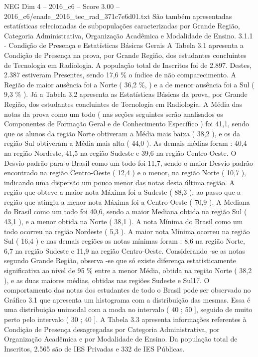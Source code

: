 \begin{textsample}{NEG Dim 4 – 2016\_c6 – Score 3.00 – 2016\_c6/enade\_2016\_tec\_rad\_371c7e6d01.txt}
São também apresentadas estatísticas selecionadas de subpopulações caracterizadas por Grande Região, Categoria Administrativa, Organização Acadêmica e Modalidade de Ensino. 3.1.1 - Condição de Presença e Estatísticas Básicas Gerais A Tabela 3.1 apresenta a Condição de Presença na prova, por Grande Região, dos estudantes concluintes de Tecnologia em Radiologia.
A população total de Inscritos foi de 2.897.
Destes, 2.387 estiveram Presentes, sendo 17,6 \% o índice de não comparecimento.
A Região de maior ausência foi a Norte ( 36,2 \%, ) e a de menor ausência foi a Sul ( 9,3 \% ).
Já a Tabela 3.2 apresenta as Estatísticas Básicas da prova, por Grande Região, dos estudantes concluintes de Tecnologia em Radiologia.
A Média das notas da prova como um todo ( nas seções seguintes serão analisados os Componentes de Formação Geral e de Conhecimento Específico ) foi 41,1, sendo que os alunos da região Norte obtiveram a Média mais baixa ( 38,2 ), e os da região Sul obtiveram a Média mais alta ( 44,0 ).
As demais médias foram : 40,4 na região Nordeste, 41,5 na região Sudeste e 39,6 na região Centro-Oeste.
O Desvio padrão para o Brasil como um todo foi 11,7, sendo o maior Desvio padrão encontrado na região Centro-Oeste ( 12,4 ) e o menor, na região Norte ( 10,7 ), indicando uma dispersão um pouco menor das notas desta última região.
A região que obteve a maior nota Máxima foi a Sudeste ( 88,3 ), ao passo que a região que atingiu a menor nota Máxima foi a Centro-Oeste ( 70,9 ).
A Mediana do Brasil como um todo foi 40,6, sendo a maior Mediana obtida na região Sul ( 43,1 ), e a menor obtida na Norte ( 38,1 ).
A nota Mínima do Brasil como um todo ocorreu na região Nordeste ( 5,3 ).
A maior nota Mínima ocorreu na região Sul ( 16,4 ) e nas demais regiões as notas mínimas foram : 8,6 na região Norte, 6,7 na região Sudeste e 11,9 na região Centro-Oeste.
Considerando -se as notas segundo Grande Região, observa -se que só existe diferença estatisticamente significativa ao nível de 95 \% entre a menor Média, obtida na região Norte ( 38,2 ), e as duas maiores médias, obtidas nas regiões Sudeste e Sul17.
O comportamento das notas dos estudantes de todo o Brasil pode ser observado no Gráfico 3.1 que apresenta um histograma com a distribuição das mesmas.
Essa é uma distribuição unimodal com a moda no intervalo ( 40 ; 50 ], seguido de muito perto pelo intervalo ( 30 ; 40 ].
A Tabela 3.3 apresenta informações referentes à Condição de Presença desagregadas por Categoria Administrativa, por Organização Acadêmica e por Modalidade de Ensino.
Da população total de Inscritos, 2.565 são de IES Privadas e 332 de IES Públicas.

\end{textsample}
